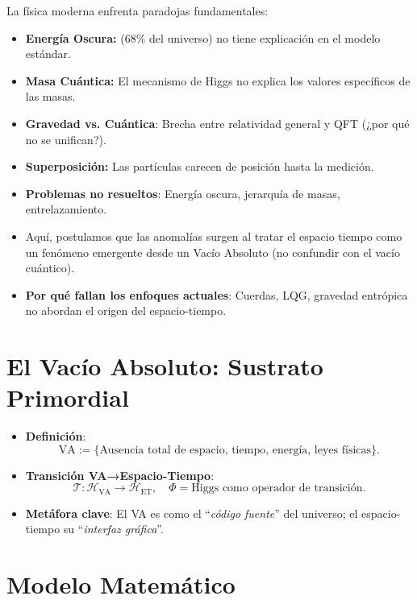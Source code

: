 \documentclass[a4paper]{article}
\theoremstyle{definition}
\theoremstyle{remark}
\numberwithin{equation}{section}
\begin{document}
	\label{sec:crisis}
	
	\noindent La física moderna enfrenta paradojas fundamentales:\\
	
	\begin{itemize}
		\item \textbf{Energía Oscura:} (68\% del universo) no tiene explicación en el modelo estándar.
		\item \textbf{Masa Cuántica:} El mecanismo de Higgs no explica los valores específicos de las masas.
		\item \textbf{Gravedad vs. Cuántica}: Brecha entre relatividad general y QFT (¿por qué no se unifican?).
		\item \textbf{Superposición:} Las partículas carecen de posición hasta la medición.
		\item \textbf{Problemas no resueltos}: Energía oscura, jerarquía de masas, entrelazamiento.
		\item Aquí, postulamos que las anomalías surgen al tratar el espacio tiempo como un fenómeno emergente desde un Vacío Absoluto (no confundir con el vacío cuántico).
		\item \textbf{Por qué fallan los enfoques actuales}: Cuerdas, LQG, gravedad entrópica no abordan el origen del espacio-tiempo.
	\end{itemize}
	
	
	\section{El Vacío Absoluto: Sustrato Primordial}
	\label{sec:VA}
	\begin{itemize}
		\item \textbf{Definición}:
		\[
		\text{VA} := \{\text{Ausencia total de espacio, tiempo, energía, leyes físicas}\}.
		\]
		\item \textbf{Transición VA→Espacio-Tiempo}:
		\[
		\mathcal{T} \colon \mathcal{H}_{\text{VA}} \to \mathcal{H}_{\text{ET}}, \quad \Phi = \text{Higgs como operador de transición}.
		\]
		\item \textbf{Metáfora clave}: El VA es como el ``\textit{código fuente}'' del universo; el espacio-tiempo su ``\textit{interfaz gráfica}''.
	\end{itemize}
	
	\section{Modelo Matemático}
	\label{sec:modelo}
\end{document}
